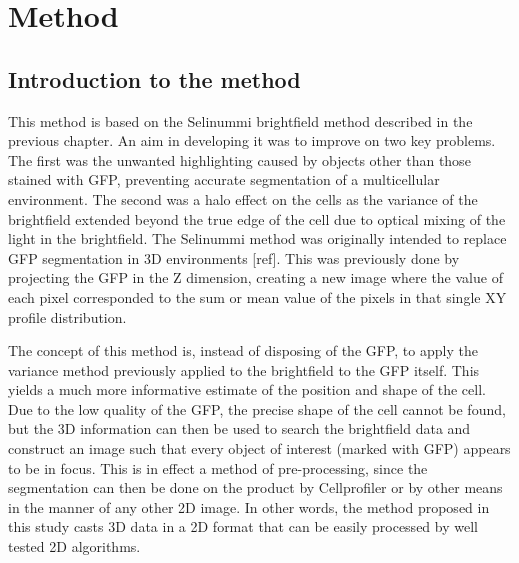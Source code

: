 
\chapter{Method}

\ifpdf
    \graphicspath{{Chapter4/Figs/Raster/}{Chapter4/Figs/PDF/}{Chapter4/Figs/}}
\else
    \graphicspath{{Chapter4/Figs/Vector/}{Chapter4/Figs/}}
\fi

\section{Introduction to the method}

This method is based on the Selinummi brightfield method described in the previous chapter. An aim in developing it was to improve on two key problems. The first was the unwanted highlighting caused by objects other than those stained with GFP, preventing accurate segmentation of a multicellular environment. The second was a halo effect on the cells as the variance of the brightfield extended beyond the true edge of the cell due to optical mixing of the light in the brightfield. The Selinummi method was originally intended to replace GFP segmentation in 3D environments [ref]. This was previously done by projecting the GFP in the Z dimension, creating a new image where the value of each pixel corresponded to the sum or mean value of the pixels in that single XY profile distribution.

The concept of this method is, instead of disposing of the GFP, to apply the variance method previously applied to the brightfield to the GFP itself. This yields a much more informative estimate of the position and shape of the cell. Due to the low quality of the GFP, the precise shape of the cell cannot be found, but the 3D information can then be used to search the brightfield data and construct an image such that every object of interest (marked with GFP) appears to be in focus. This is in effect a method of pre-processing, since the segmentation can then be done on the product by Cellprofiler or by other means in the manner of any other 2D image. In other words, the method proposed in this study casts 3D data in a 2D format that can be easily processed by well tested 2D algorithms.

